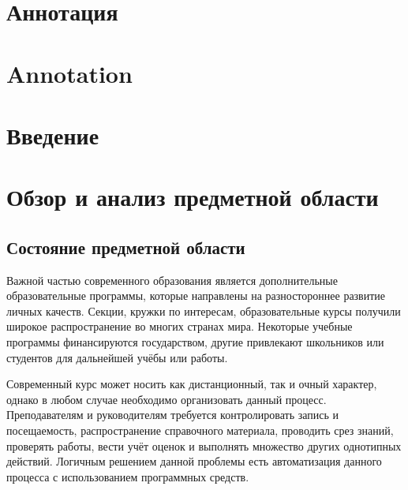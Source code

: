 \documentclass[a4paper,14pt]{article}
\begin{document}


\section*{Аннотация}


\pagebreak

\section*{Annotation}

\pagebreak

\tableofcontents
\pagebreak

\section*{Введение}

\pagebreak

\section{Обзор и анализ предметной области}

\subsection{Состояние предметной области}

Важной частью современного образования является дополнительные образовательные программы, которые направлены на разностороннее развитие личных качеств.
Секции, кружки по интересам, образовательные курсы получили широкое распространение во многих странах мира.
Некоторые учебные программы финансируются государством, другие привлекают школьников или студентов для дальнейшей учёбы или работы.

Современный курс может носить как дистанционный, так и очный характер, однако в любом случае необходимо организовать данный процесс.
Преподавателям и руководителям требуется контролировать запись и посещаемость, распространение справочного материала, проводить срез знаний, проверять работы, вести учёт оценок и выполнять множество других однотипных действий.
Логичным решением данной проблемы есть автоматизация данного процесса с использованием программных средств.
\end{document}
